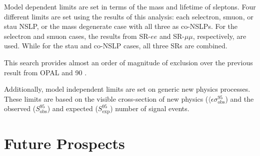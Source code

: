 Model dependent limits are set in terms of the mass and lifetime of sleptons. Four different limits are set using the results of this analysis: each selectron, smuon, or stau \ac{NSLP}, or the mass degenerate case with all three as co-NSLPs. For the selectron and smuon cases, the results from SR-$ee$ and SR-$\mu\mu$, respectively, are used. While for the stau and co-NSLP cases, all three SRs are combined.


This search provides almost an order of magnitude of exclusion over the previous result from OPAL and 90 \GeV. 


Additionally, model independent limits are set on generic new physics processes. These limits are based on the visible cross-section of new physics ($\langle \epsilon \sigma^{95}_{\text{obs}}$) and the observed ($S^{95}_{\text{obs}}$) and expected ($S^{95}_{\text{exp}}$) number of signal events. 




\section{Future Prospects}

